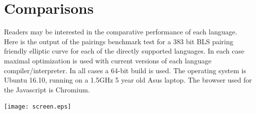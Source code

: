 \documentclass{llncs}
\begin{document}
\newpage
\section*{Comparisons}

Readers may be interested in the comparative performance of each language. Here is the output of the pairings benchmark test for a 383 bit BLS 
pairing friendly elliptic curve for each of the directly supported languages.  In each case maximal optimization is used with current versions of 
each language compiler/interpreter. In all cases a 64-bit build is used. The operating system is Ubuntu 16.10, running on a 1.5GHz 5 year old 
Asus laptop. The browser used for the Javascript is Chromium. 

\bigskip
\bigskip

\texttt{[image: screen.eps]}
\end{document}
